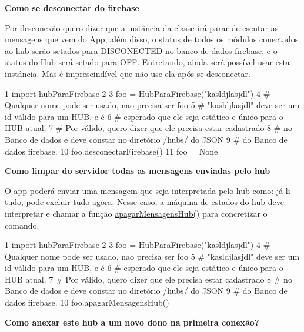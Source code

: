 {\bfseries Como se desconectar do firebase}

Por desconexão quero dizer que a instância da classe irá parar de escutar as mensagens que vem do App, além disso, o status de todos os módulos conectados ao hub serão setados para D\+I\+S\+C\+O\+N\+E\+C\+T\+ED no banco de dados firebase, e o status do Hub será setado para O\+FF. Entretando, ainda será possível usar esta instância. Mas é imprescindível que não use ela após se desconectar.


\begin{DoxyCode}
1 \textcolor{keyword}{import} hubParaFirebase
2 
3 foo = HubParaFirebase(\textcolor{stringliteral}{"kasldjlasjdl"})
4 \textcolor{comment}{#  Qualquer nome pode ser usado, nao precisa ser foo}
5 \textcolor{comment}{#  "kasldjlasjdl" deve ser um id válido para um HUB, e é}
6 \textcolor{comment}{# esperado que ele seja estático e único para o HUB atual.}
7 \textcolor{comment}{#  Por válido, quero dizer que ele precisa estar cadastrado}
8 \textcolor{comment}{# no Banco de dados e deve constar no diretório /hubs/ do JSON}
9 \textcolor{comment}{# do Banco de dados firebase.}
10 foo.desconectarFirebase()
11 foo = \textcolor{keywordtype}{None}
\end{DoxyCode}


{\bfseries Como limpar do servidor todas as mensagens enviadas pelo hub}

O app poderá enviar uma mensagem que seja interpretada pelo hub como\+: já li tudo, pode excluir tudo agora. Nesse caso, a máquina de estados do hub deve interpretar e chamar a função \hyperlink{classhub_para_firebase_1_1_hub_para_firebase_a434ba152fb00900dddfaf2f61e5d78b6}{apagar\+Mensagens\+Hub()} para concretizar o comando.


\begin{DoxyCode}
1 \textcolor{keyword}{import} hubParaFirebase
2 
3 foo = HubParaFirebase(\textcolor{stringliteral}{"kasldjlasjdl"})
4 \textcolor{comment}{#  Qualquer nome pode ser usado, nao precisa ser foo}
5 \textcolor{comment}{#  "kasldjlasjdl" deve ser um id válido para um HUB, e é}
6 \textcolor{comment}{# esperado que ele seja estático e único para o HUB atual.}
7 \textcolor{comment}{#  Por válido, quero dizer que ele precisa estar cadastrado}
8 \textcolor{comment}{# no Banco de dados e deve constar no diretório /hubs/ do JSON}
9 \textcolor{comment}{# do Banco de dados firebase.}
10 foo.apagarMensagensHub()
\end{DoxyCode}


{\bfseries Como anexar este hub a um novo dono na primeira conexão?}

